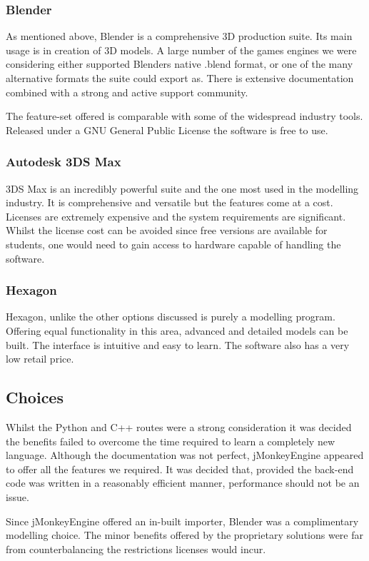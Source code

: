 \subsubsection{Blender}

As mentioned above, Blender is a comprehensive 3D production suite.
Its main usage is in creation of 3D models. A large number of the
games engines we were considering either supported Blenders native
.blend format, or one of the many alternative formats the suite could
export as. There is extensive documentation combined with a strong
and active support community.

The feature-set offered is comparable with some of the widespread industry
tools. Released under a GNU General Public License the software is
free to use.


\subsubsection{Autodesk 3DS Max}

3DS Max is an incredibly powerful suite and the one most used in the
modelling industry. It is comprehensive and versatile but the features come
at a cost. Licenses are extremely expensive and the system requirements
are significant. Whilst the license cost can be avoided since free
versions are available for students, one would need to gain access
to hardware capable of handling the software.

\subsubsection{Hexagon}

Hexagon, unlike the other options discussed is purely a modelling program.
Offering equal functionality in this area, advanced and detailed models
can be built. The interface is intuitive and easy to learn. The software
also has a very low retail price.

\subsection{Choices}

Whilst the Python and C++ routes were a strong consideration it was
decided the benefits failed to overcome the time required to learn
a completely new language. Although the documentation was not perfect,
jMonkeyEngine appeared to offer all the features we required. It was decided
that, provided the back-end code was written in a reasonably efficient
manner, performance should not be an issue.

Since jMonkeyEngine offered an in-built importer, Blender was a complimentary
modelling choice. The minor benefits offered by the proprietary solutions
were far from counterbalancing the restrictions licenses would incur.

